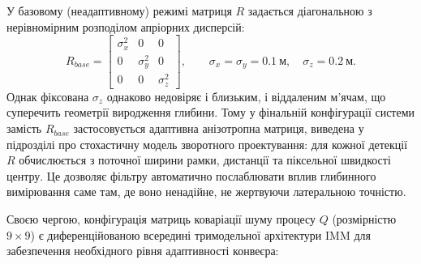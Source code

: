 У базовому (неадаптивному) режимі матриця $R$ задається діагональною з
нерівномірним розподілом апріорних дисперсій:
\begin{equation}R_{base} = \begin{bmatrix} \sigma_x^2 & 0 & 0 \\ 0 & \sigma_y^2 & 0 \\ 0 & 0 & \sigma_z^2 \end{bmatrix},
\qquad \sigma_x = \sigma_y = 0.1~\text{м},\quad \sigma_z = 0.2~\text{м}.\end{equation}
Однак фіксована $\sigma_z$ однаково недовіряє і близьким, і віддаленим м'ячам, що
суперечить геометрії виродження глибини. Тому у фінальній конфігурації системи
замість $R_{base}$ застосовується адаптивна анізотропна матриця, виведена у
підрозділі про стохастичну модель зворотного проектування: для кожної детекції
$R$ обчислюється з поточної ширини рамки, дистанції та піксельної швидкості
центру. Це дозволяє фільтру автоматично послаблювати вплив глибинного вимірювання
саме там, де воно ненадійне, не жертвуючи латеральною точністю.

Своєю чергою, конфігурація матриць коваріації шуму процесу $Q$ (розмірністю $9 \times 9$) є диференційованою всередині
тримодельної архітектури \gls{IMM} для забезпечення необхідного рівня адаптивності
конвеєра:


